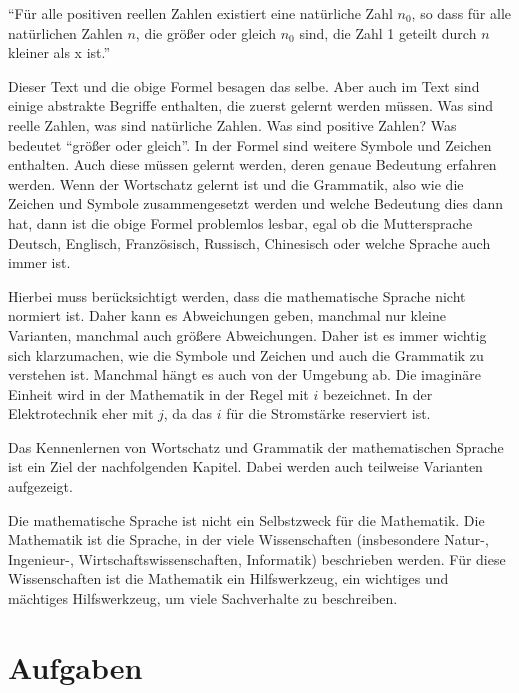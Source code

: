 \enquote{Für alle positiven reellen Zahlen existiert eine natürliche Zahl 
$n_0$, so dass für alle natürlichen Zahlen $n$, die größer oder gleich $n_0$ 
sind, die Zahl 1 geteilt durch $n$ kleiner als x ist.}

Dieser Text und die obige Formel besagen das selbe. Aber auch im Text sind 
einige abstrakte Begriffe enthalten, die zuerst gelernt werden müssen. Was 
sind reelle Zahlen, was sind natürliche Zahlen. Was sind positive Zahlen? Was
bedeutet \enquote{größer oder gleich}. In der Formel sind weitere Symbole und
Zeichen enthalten. Auch diese müssen gelernt werden, deren genaue Bedeutung 
erfahren werden. Wenn der Wortschatz gelernt ist und die Grammatik, also wie 
die Zeichen und Symbole zusammengesetzt werden und welche Bedeutung dies dann 
hat, dann ist die obige Formel problemlos lesbar, egal ob die 
Muttersprache Deutsch, Englisch, Französisch, Russisch, Chinesisch oder 
welche Sprache auch immer ist.

Hierbei muss berücksichtigt werden, dass die mathematische Sprache nicht 
normiert ist. Daher kann es Abweichungen geben, manchmal nur kleine Varianten,
manchmal auch größere Abweichungen. Daher ist es immer wichtig sich 
klarzumachen, wie die Symbole und Zeichen und auch die Grammatik zu verstehen 
ist. Manchmal hängt es auch von der Umgebung ab. Die imaginäre Einheit wird in 
der Mathematik in der Regel mit $i$ bezeichnet. In der Elektrotechnik eher mit 
$j$, da das $i$ für die Stromstärke reserviert ist.

Das Kennenlernen von Wortschatz und Grammatik der mathematischen Sprache ist 
ein Ziel der nachfolgenden Kapitel. Dabei werden auch teilweise Varianten
aufgezeigt. 

Die mathematische Sprache ist nicht ein Selbstzweck für die Mathematik. Die
Mathematik ist die Sprache, in der viele Wissenschaften (insbesondere Natur-,
Ingenieur-, Wirtschaftswissenschaften, Informatik) beschrieben werden. Für 
diese Wissenschaften ist die Mathematik ein Hilfswerkzeug, ein wichtiges und
mächtiges Hilfswerkzeug, um viele Sachverhalte zu beschreiben.

\section{Aufgaben}

\renewcommand{\mitAufgaben}{Ja}
\renewcommand{\mitLoesungen}{Nein}



%
